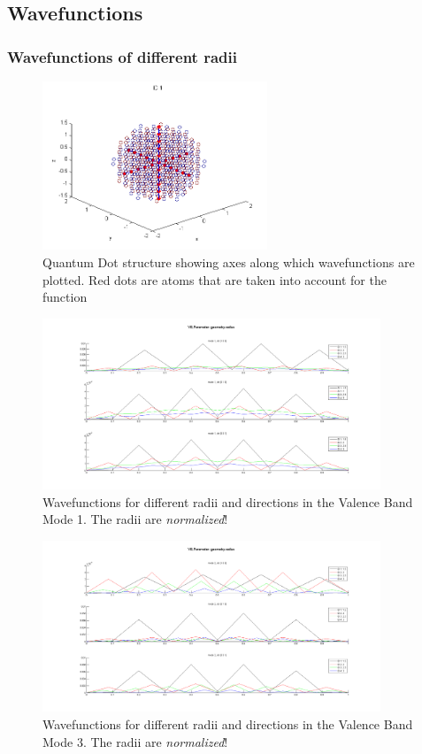 \documentclass[a4paper, 11pt, landscape]{article}
\begin{document}
		\newpage
		\subsection{Wavefunctions}
		\subsubsection*{Wavefunctions of different radii}
			\begin{figure}[htbp]
				\centering
				\includegraphics[width=0.6\textwidth]{figures/gridPlotAxis.png}
				\caption{Quantum Dot structure showing axes along which wavefunctions are plotted.
								 Red dots are atoms that are taken into account for the function}
			\end{figure}
		
			\begin{figure}[htbp]
				\centering
				\includegraphics[width=0.9\textwidth]{figures/EVPlot3AxesMod1.png}
				\caption{Wavefunctions for different radii and directions in the Valence Band Mode 1. The radii are {\it normalized}!}
			\end{figure}
			
			\newpage
			\begin{figure}[htbp]
			  \centering
				\includegraphics[width=0.9\textwidth]{figures/EVPlot3AxesMod3.png}
				\caption{Wavefunctions for different radii and directions in the Valence Band Mode 3. The radii are {\it normalized}!}
			\end{figure}
			
\end{document}
